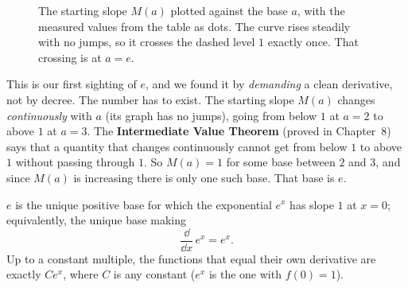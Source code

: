 \begin{figure}[htbp]
\centering
{}
\caption{The starting slope $M(a)$ plotted against the base $a$, with the measured values from the table as dots. The curve rises steadily with no jumps, so it crosses the dashed level $1$ exactly once. That crossing is at $a=e$.}
\label{ch03:fig-M-of-a}
\end{figure}

This is our first sighting of $e$, and we found it by \emph{demanding} a clean derivative, not by decree. The number has to exist. The starting slope $M(a)$ changes \emph{continuously} with $a$ (its graph has no jumps), going from below $1$ at $a=2$ to above $1$ at $a=3$. The \textbf{Intermediate Value Theorem} (proved in Chapter~8) says that a quantity that changes continuously cannot get from below $1$ to above $1$ without passing through $1$. So $M(a)=1$ for some base between $2$ and $3$, and since $M(a)$ is increasing there is only one such base. That base is $e$.

\begin{definition}\label{ch03:def-e-slope}
$e$ is the unique positive base for which the exponential $e^x$ has slope $1$ at $x=0$; equivalently, the unique base making
\[
\frac{\dd}{\dd x}\,e^{x} = e^{x}.
\]
Up to a constant multiple, the functions that equal their own derivative are exactly $C e^x$, where $C$ is any constant ($e^x$ is the one with $f(0)=1$).
\end{definition}

